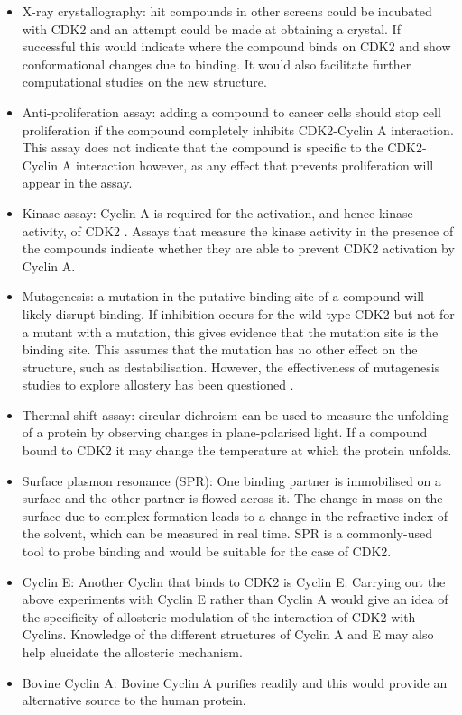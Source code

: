 \begin{itemize}
\item X-ray crystallography: hit compounds in other screens could be incubated with CDK2 and an attempt could be made at obtaining a crystal.
If successful this would indicate where the compound binds on CDK2 and show conformational changes due to binding.
It would also facilitate further computational studies on the new structure.
\item Anti-proliferation assay: adding a compound to cancer cells should stop cell proliferation if the compound completely inhibits CDK2-Cyclin A interaction.
This assay does not indicate that the compound is specific to the CDK2-Cyclin A interaction however, as any effect that prevents proliferation will appear in the assay.
\item Kinase assay: Cyclin A is required for the activation, and hence kinase activity, of CDK2 \cite{Jeffrey1995}.
Assays that measure the kinase activity in the presence of the compounds indicate whether they are able to prevent CDK2 activation by Cyclin A.
\item Mutagenesis: a mutation in the putative binding site of a compound will likely disrupt binding.
If inhibition occurs for the wild-type CDK2 but not for a mutant with a mutation, this gives evidence that the mutation site is the binding site.
This assumes that the mutation has no other effect on the structure, such as destabilisation.
However, the effectiveness of mutagenesis studies to explore allostery has been questioned \cite{Tang2017}.
\item Thermal shift assay: circular dichroism can be used to measure the unfolding of a protein by observing changes in plane-polarised light. %
If a compound bound to CDK2 it may change the temperature at which the protein unfolds.
\item Surface plasmon resonance (SPR): One binding partner is immobilised on a surface and the other partner is flowed across it.
The change in mass on the surface due to complex formation leads to a change in the refractive index of the solvent, which can be measured in real time.
SPR is a commonly-used tool to probe binding and would be suitable for the case of CDK2.
\item Cyclin E: Another Cyclin that binds to CDK2 is Cyclin E.
Carrying out the above experiments with Cyclin E rather than Cyclin A would give an idea of the specificity of allosteric modulation of the interaction of CDK2 with Cyclins.
Knowledge of the different structures of Cyclin A and E may also help elucidate the allosteric mechanism.
\item Bovine Cyclin A: Bovine Cyclin A purifies readily \cite{} and this would provide an alternative source to the human protein.

\end{itemize}

